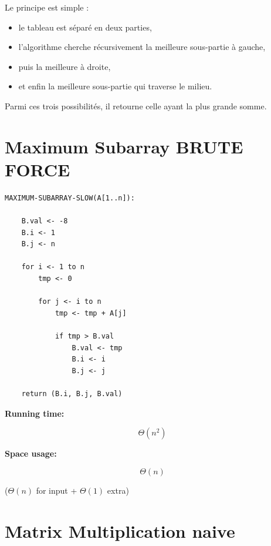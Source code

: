 \documentclass[11pt,a4paper,openany]{book}
\begin{document}
Le principe est simple :
\begin{itemize}
    \item le tableau est séparé en deux parties,
    \item l'algorithme cherche récursivement la meilleure sous-partie à gauche,
    \item puis la meilleure à droite,
    \item et enfin la meilleure sous-partie qui traverse le milieu.
\end{itemize}

Parmi ces trois possibilités, il retourne celle ayant la plus grande somme.









\vspace{2cm}


\section{Maximum Subarray BRUTE FORCE}


\begin{lstlisting}
MAXIMUM-SUBARRAY-SLOW(A[1..n]):

    B.val <- -8
    B.i <- 1
    B.j <- n

    for i <- 1 to n
        tmp <- 0

        for j <- i to n
            tmp <- tmp + A[j]

            if tmp > B.val
                B.val <- tmp
                B.i <- i
                B.j <- j

    return (B.i, B.j, B.val)
\end{lstlisting}

\textbf{Running time:}

\[
\Theta(n^2)
\]

\textbf{Space usage:}

\[
\Theta(n)
\]

(\(\Theta(n)\) for input + \(\Theta(1)\) extra)



\vspace{2cm}













\section{Matrix Multiplication naive}
\end{document}
